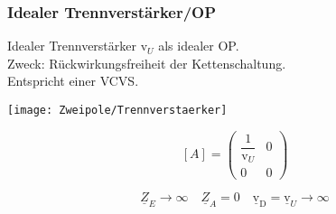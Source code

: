 \subsubsection{Idealer Trennverst\"arker/OP}
Idealer Trennverstärker  $\text{v}_U$ als idealer OP.\\ 
Zweck: Rückwirkungsfreiheit der Kettenschaltung.\\
Entspricht einer VCVS.\\
\begin{minipage}{0.5\columnwidth}
\texttt{[image: Zweipole/Trennverstaerker]}
\end{minipage}
\begin{minipage}{0.5\columnwidth}
	\[
	[A] = \begin{pmatrix}
		\dfrac{1}{\text{v}_U} & 0 \\
		0        & 0
	\end{pmatrix}
	\]
\end{minipage}
\begin{equation*}
	\underline{Z}_E \rightarrow \infty \quad \underline{Z}_A = 0 \quad \underline{\text{v}}_{\text{D}}=\underline{\text{v}}_U \rightarrow \infty
\end{equation*}
